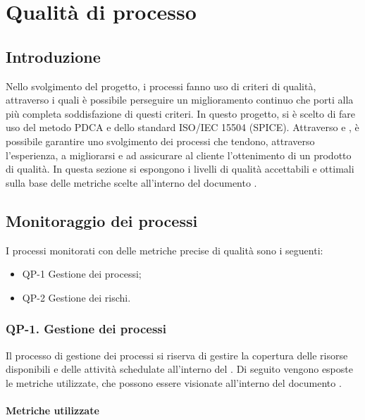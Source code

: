 \section{Qualità di processo}

\subsection{Introduzione}

Nello svolgimento del progetto, i processi fanno uso di criteri di qualità, attraverso i quali è possibile perseguire un miglioramento continuo che porti alla più completa soddisfazione di questi criteri. In questo progetto, si è scelto di fare uso del metodo PDCA e dello standard ISO/IEC 15504 (SPICE). Attraverso  e , è possibile garantire uno svolgimento dei processi che tendono, attraverso l'esperienza, a migliorarsi e ad assicurare al cliente l'ottenimento di un prodotto di qualità.
In questa sezione si espongono i livelli di qualità accettabili e ottimali sulla base delle metriche scelte all'interno del documento .

\subsection{Monitoraggio dei processi}

I processi monitorati con delle metriche precise di qualità sono i seguenti:

\begin{itemize}
	\item QP-1 Gestione dei processi;
	\item QP-2 Gestione dei rischi.
\end{itemize}

	\subsubsection{QP-1. Gestione dei processi}

		Il processo di gestione dei processi si riserva di gestire la copertura delle risorse disponibili e delle attività schedulate all'interno del . Di seguito vengono esposte le metriche utilizzate, che possono essere visionate all'interno del documento .

		\paragraph{Metriche utilizzate}

